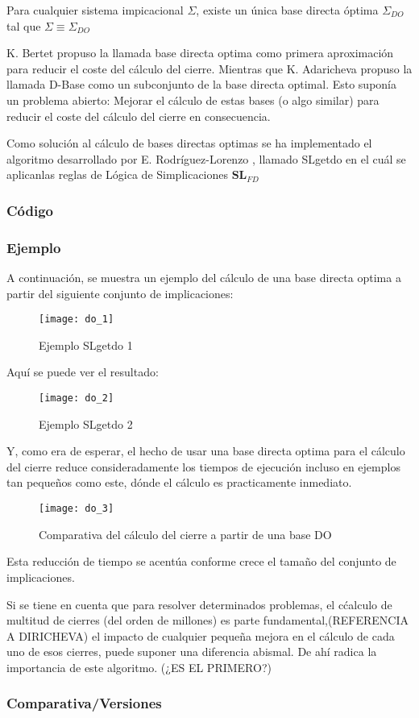 Para cualquier sistema impicacional \(\Sigma\), existe un \'unica base directa \'optima \(\Sigma_{DO}\) tal que \(\Sigma \equiv \Sigma_{DO} \)

K. Bertet \cite{BERTET20102155} propuso la llamada base directa optima como primera aproximaci\'on para reducir el coste del c\'alculo del cierre. Mientras que  K. Adaricheva \cite{Adaricheva} propuso la llamada D-Base como un subconjunto de la base directa optimal. Esto supon\'ia un problema abierto: Mejorar el c\'alculo de estas bases (o algo similar) para reducir el coste del c\'alculo del cierre en consecuencia.

Como soluci\'on al c\'alculo de bases directas optimas se ha implementado el algoritmo desarrollado por  E. Rodr\'iguez-Lorenzo \cite{DO2}, llamado SLgetdo en el cu\'al se aplicanlas reglas de L\'ogica de Simplicaciones \(\textbf{SL}_{FD}\) 
\newpage
\subsubsection{C\'odigo} 

\newpage
\subsubsection{Ejemplo} 
A continuaci\'on, se muestra un ejemplo del c\'alculo de una base directa optima a partir del siguiente conjunto de implicaciones: 
\begin{figure}[H]
    \centering
    \texttt{[image: do\_1]}
    \caption{Ejemplo SLgetdo 1}
    \label{fig:do_1}
\end{figure} 

Aqu\'i se puede ver el resultado:
\begin{figure}[H]
    \centering
    \texttt{[image: do\_2]}
    \caption{Ejemplo SLgetdo 2}
    \label{fig:do_2}
\end{figure} 
Y, como era de esperar, el hecho de usar una base directa optima para el c\'alculo del cierre reduce consideradamente los tiempos de ejecuci\'on incluso en ejemplos tan peque\~nos como este, d\'onde el c\'alculo es practicamente inmediato.
\begin{figure}[H]
    \centering
    \texttt{[image: do\_3]}
    \caption{Comparativa del c\'alculo del cierre a partir de una base DO}
    \label{fig:do_3}
\end{figure} 

Esta reducci\'on de tiempo se acent\'ua conforme crece el tama\~no del conjunto de implicaciones.

Si se tiene en cuenta que para resolver determinados problemas, el c\'calculo de multitud de cierres (del orden de millones) es parte fundamental,(REFERENCIA A DIRICHEVA) el impacto de cualquier peque\~na mejora en el c\'alculo de cada uno de esos cierres, puede suponer una diferencia abismal. De ah\'i radica la importancia de este algoritmo.
(¿ES EL PRIMERO?)
\subsubsection{Comparativa/Versiones} 